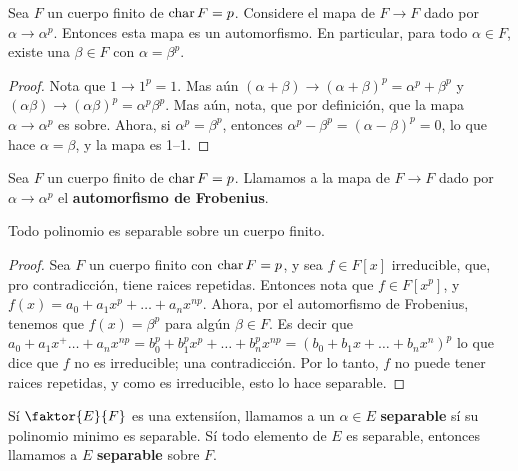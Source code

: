 \begin{lemma}\label{lemma_90}
    Sea $F$ un cuerpo finito de $\operatorname{char}{F}=p$. Considere el mapa de $F
    \xrightarrow{} F$ dado por $\alpha \xrightarrow{} \alpha^p$. Entonces esta
    mapa es un automorfismo. En particular, para todo $\alpha \in F$, existe una
     $\beta \in F$ con  $\alpha=\beta^p$.
\end{lemma}
\begin{proof}
    Nota que $1 \xrightarrow{} 1^p=1$. Mas a\'un $(\alpha+\beta) \xrightarrow{}
    (\alpha+\beta)^p=\alpha^p+\beta^p$ y $(\alpha\beta) \xrightarrow{}
    (\alpha\beta)^p=\alpha^p\beta^p$. Mas a\'un, nota, que por definici\'on, que
    la mapa $\alpha \xrightarrow{} \alpha^p$ es sobre. Ahora, si
    $\alpha^p=\beta^p$, entonces $\alpha^p-\beta^p=(\alpha-\beta)^p=0$, lo que
    hace $\alpha=\beta$, y la mapa es 1--1.
\end{proof}

\begin{definition}
    Sea $F$ un cuerpo finito de $\operatorname{char}{F}=p$. Llamamos a la mapa de $F
    \xrightarrow{} F$ dado por $\alpha \xrightarrow{} \alpha^p$ el
    \textbf{automorfismo de Frobenius}.
\end{definition}

\begin{lemma}\label{lemma_91}
    Todo polinomio es separable sobre un cuerpo finito.
\end{lemma}
\begin{proof}
    Sea $F$ un cuerpo finito con  $\operatorname{char}{F}=p$, y sea $f \in F[x]$ irreducible,
    que, pro contradicci\'on, tiene raices repetidas. Entonces nota que $f \in
    F[x^p]$, y $f(x)=a_0+a_1x^p+\dots+a_nx^{np}$. Ahora, por el automorfismo de
    Frobenius, tenemos que $f(x)=\beta^p$ para alg\'un $\beta \in F$. Es decir
    que
    $a_0+a_1x^+\dots+a_nx^{np}=b_0^p+b_1^px^p+\dots+b_n^px^{np}=(b_0+b_1x+\dots+
    b_nx^n)^p$ lo que dice que $f$ no es irreducible; una contradicci\'on. Por
    lo tanto, $f$ no puede tener raices repetidas, y como es irreducible, esto
    lo hace separable.
\end{proof}

\begin{definition}
    S\'i $\faktor{E}{F}$ es una extensi\'ion, llamamos a un $\alpha \in E$
    \textbf{separable} s\'i su polinomio minimo es separable. S\'i todo elemento
    de $E$ es separable, entonces llamamos a  $E$  \textbf{separable} sobre $F$.
\end{definition}

